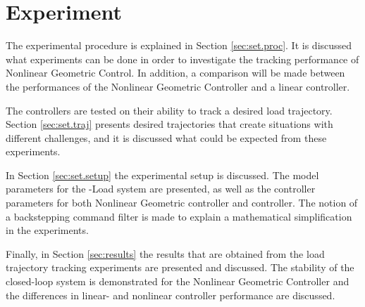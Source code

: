 \chapter{Experiment}\label{ch:setup}
The experimental procedure is explained in Section \ref{sec:set.proc}. 
It is discussed what experiments can be done in order to investigate the tracking performance of Nonlinear Geometric Control.
In addition, a comparison will be made between the performances of the Nonlinear Geometric Controller and a linear  controller.

The controllers are tested on their ability to track a desired load trajectory. 
Section \ref{sec:set.traj} presents desired trajectories that create situations with different challenges, and it is discussed what could be expected from these experiments.

In Section \ref{sec:set.setup} the experimental setup is discussed. 
The model parameters for the -Load system are presented, as well as the controller parameters for both Nonlinear Geometric controller and  controller.
The notion of a backstepping command filter is made to explain a mathematical simplification in the experiments.

Finally, in Section \ref{sec:results} the results that are obtained from the load trajectory tracking experiments are presented and discussed.
The stability of the closed-loop system is demonstrated for the Nonlinear Geometric Controller and the differences in linear- and nonlinear controller performance are discussed.


